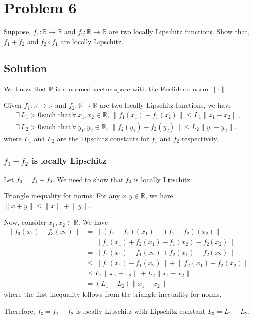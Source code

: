 \section*{Problem 6}

Suppose, \( f_1 : \mathbb{R} \rightarrow \mathbb{R} \) and \( f_2 : \mathbb{R} \rightarrow \mathbb{R} \) are two locally Lipschitz functions.
Show that, \( f_1 + f_2 \) and \( f_2 \circ f_1 \) are locally Lipschitz.

\subsection*{Solution}

We know that \( \mathbb{R} \) is a normed vector space with the Euclidean norm \( \lVert \cdot \rVert \).

Given \( f_1 : \mathbb{R} \rightarrow \mathbb{R} \) and \( f_2 : \mathbb{R} \rightarrow \mathbb{R} \) are two locally Lipschitz functions, we have
\begin{align*}
    \exists \, L_1 > 0 \, \text{such that} \, \forall \, x_1, x_2 \in \mathbb{R}, \, \lVert f_1(x_1) - f_1(x_2) \rVert \leq L_1 \lVert x_1 - x_2 \rVert, \\
    \exists \, L_2 > 0 \, \text{such that} \, \forall \, y_1, y_2 \in \mathbb{R}, \, \lVert f_2(y_1) - f_2(y_2) \rVert \leq L_2 \lVert y_1 - y_2 \rVert .
\end{align*}
where \( L_1 \) and \( L_2 \) are the Lipschitz constants for \( f_1 \) and \( f_2 \) respectively.

\subsubsection*{\( f_1 + f_2 \) is locally Lipschitz}

Let \( f_3 = f_1 + f_2 \).
We need to show that \( f_3 \) is locally Lipschitz.

\begin{lemma}{Triangle inequality for norms:}
    For any \( x, y \in \mathbb{R} \), we have \( \lVert x + y \rVert \leq \lVert x \rVert + \lVert y \rVert \).
\end{lemma}

Now, consider \( x_1, x_2 \in \mathbb{R} \).
We have
\begin{align*}
    \lVert f_3(x_1) - f_3(x_2) \rVert
     & =
    \lVert (f_1 + f_2)(x_1) - (f_1 + f_2)(x_2) \rVert
    \\ & =
    \lVert f_1(x_1) + f_2(x_1) - f_1(x_2) - f_2(x_2) \rVert
    \\ & =
    \lVert f_1(x_1) - f_1(x_2) + f_2(x_1) - f_2(x_2) \rVert
    \\ & \leq
    \lVert f_1(x_1) - f_1(x_2) \rVert + \lVert f_2(x_1) - f_2(x_2) \rVert
    \\ & \leq
    L_1 \lVert x_1 - x_2 \rVert + L_2 \lVert x_1 - x_2 \rVert
    \\ & = (L_1 + L_2) \lVert x_1 - x_2 \rVert
\end{align*}
where the first inequality follows from the triangle inequality for norms.

Therefore, \( f_3 = f_1 + f_2 \) is locally Lipschitz with Lipschitz constant \( L_3 = L_1 + L_2 \).
